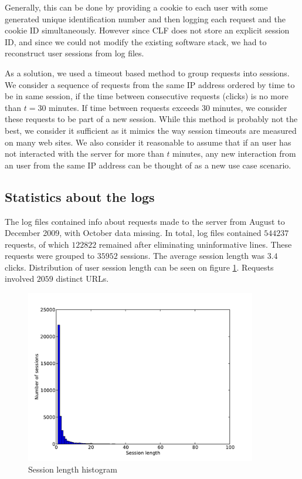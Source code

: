 \documentclass[12pt, english,a4paper]{article}
\begin{document}
Generally, this can be done by providing a cookie to each user with some generated unique identification number and then logging each request and the cookie ID simultaneously. However since CLF does not store an explicit session ID, and since we could not modify the existing software stack, we had to reconstruct user sessions from log files.  

As a solution, we used a timeout based method to group requests into sessions. We consider a sequence of requests from the same IP address ordered by time to be in same session, if the time between consecutive requests (clicks) is no more than $t = 30$ minutes. If time between requests exceeds $30$ minutes, we consider these requests to be part of a new session. While this method is probably not the best, we consider it sufficient as it mimics the way session timeouts are measured on many web sites. We also consider it reasonable to assume that if an user has not interacted with the server for more than $t$
minutes, any new interaction from an user from the same IP address can be thought of as a new use case scenario.







\subsection{Statistics about the logs} 
The log files contained info about requests made to the server from August to December 2009, with October data missing. In total, log files contained $544237$ requests, of which $122822$ remained after eliminating uninformative lines. These requests were grouped to $35952$ sessions. The average session length was $3.4$ clicks. Distribution of user session length can be seen on figure \ref{session_len}. Requests involved $2059$ distinct URLs.

\begin{figure}[H]
  \centering
      \includegraphics[width=0.9\textwidth]{session_len}
  \caption{Session length histogram}
  \label{session_len}
\end{figure}
\end{document}
